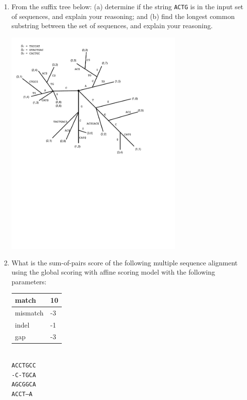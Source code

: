 \documentclass[11pt, oneside]{article}   	%
\begin{document}
\begin{enumerate}
 \clearpage
 \item From the suffix tree below: 
(a) determine if the string \texttt{ACTG} is in the input set of sequences, and explain your reasoning; and 
(b) find the longest common substring between the set of sequences, and explain your reasoning. 

\begin{center}
\includegraphics[width=0.7\textwidth]{Midterm_Practice_4}
\end{center}

\clearpage
\item What is the sum-of-pairs score of the following multiple sequence alignment using the global scoring with affine scoring model with the following parameters: 
\begin{center}
\begin{tabular}{|l|l|}
\hline
match & 10\\
\hline
mismatch & -3\\
\hline
indel & -1\\
\hline
gap & -3\\
\hline
\end{tabular} \\
\vspace{3em}
\texttt{ACCTGCC}\\
\texttt{-C-TGCA}\\
\texttt{AGCGGCA}\\
\texttt{ACCT--A}\\


\end{center}
\end{enumerate}
\end{document}
